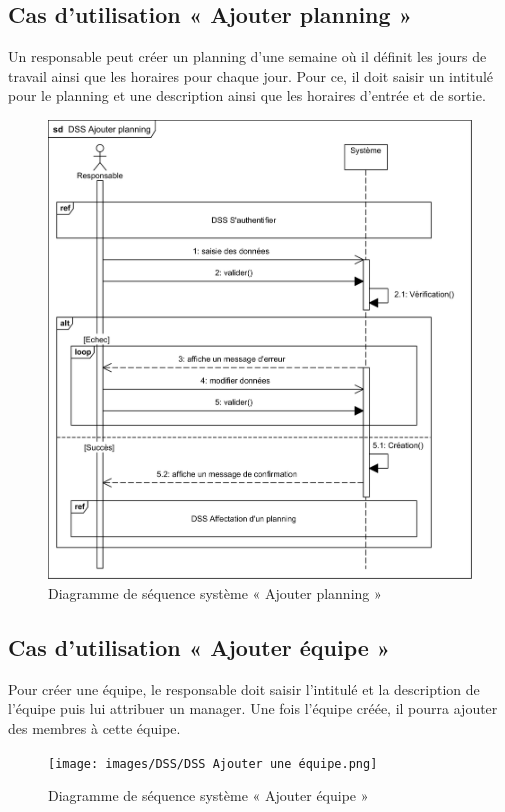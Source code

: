 \subsection{Cas d'utilisation « Ajouter planning »}
Un responsable peut créer un planning d’une semaine où il définit les jours de
travail ainsi que les horaires pour chaque jour. Pour ce, il doit saisir un
intitulé pour le planning et une description ainsi que les horaires d’entrée et
de sortie.   

\begin{figure}[h!]
     \centering
    \includegraphics[scale=1]{images/DSS/DSS Ajouter planning.png}
     \caption{Diagramme de séquence système « Ajouter planning »}
     \label{fig4}
\end{figure}
    
\subsection{Cas d'utilisation « Ajouter équipe »}
Pour créer une équipe, le responsable doit saisir l’intitulé et la description
de l’équipe puis lui attribuer un manager. Une fois l’équipe créée, il pourra
ajouter des membres à cette équipe.   

\clearpage
\begin{figure}[h!]
     \centering
    \texttt{[image: images/DSS/DSS Ajouter une équipe.png]}
     \caption{Diagramme de séquence système « Ajouter équipe »}
     \label{fig4}
\end{figure}
    
